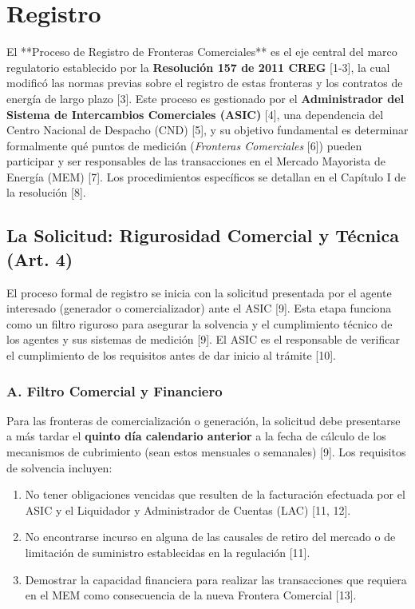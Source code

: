 \documentclass[a5paper]{book}%
\begin{document}
\section{Registro}

El **Proceso de Registro de Fronteras Comerciales** es el eje central del marco regulatorio establecido por la \textbf{Resolución 157 de 2011 CREG} [1-3], la cual modificó las normas previas sobre el registro de estas fronteras y los contratos de energía de largo plazo [3]. Este proceso es gestionado por el \textbf{Administrador del Sistema de Intercambios Comerciales (ASIC)} [4], una dependencia del Centro Nacional de Despacho (CND) [5], y su objetivo fundamental es determinar formalmente qué puntos de medición (\textit{Fronteras Comerciales} [6]) pueden participar y ser responsables de las transacciones en el Mercado Mayorista de Energía (MEM) [7]. Los procedimientos específicos se detallan en el Capítulo I de la resolución [8].

\subsection{La Solicitud: Rigurosidad Comercial y Técnica (Art. 4\textdegree)}

El proceso formal de registro se inicia con la solicitud presentada por el agente interesado (generador o comercializador) ante el ASIC [9]. Esta etapa funciona como un filtro riguroso para asegurar la solvencia y el cumplimiento técnico de los agentes y sus sistemas de medición [9]. El ASIC es el responsable de verificar el cumplimiento de los requisitos antes de dar inicio al trámite [10].

\subsubsection*{A. Filtro Comercial y Financiero}
Para las fronteras de comercialización o generación, la solicitud debe presentarse a más tardar el \textbf{quinto día calendario anterior} a la fecha de cálculo de los mecanismos de cubrimiento (sean estos mensuales o semanales) [9]. Los requisitos de solvencia incluyen:
\begin{enumerate}
	\item No tener obligaciones vencidas que resulten de la facturación efectuada por el ASIC y el Liquidador y Administrador de Cuentas (LAC) [11, 12].
	\item No encontrarse incurso en alguna de las causales de retiro del mercado o de limitación de suministro establecidas en la regulación [11].
	\item Demostrar la capacidad financiera para realizar las transacciones que requiera en el MEM como consecuencia de la nueva Frontera Comercial [13].
\end{enumerate}
\end{document}
